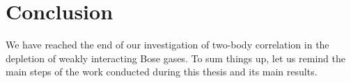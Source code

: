 



\section{Conclusion}

We have reached the end of our investigation of two-body correlation in the depletion of weakly interacting Bose gases. To sum things up, let us remind the main steps of the work conducted during this thesis and its main results.

